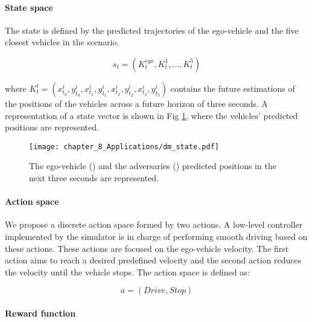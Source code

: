 \paragraph{State space}
\label{par:8_decision_making_our_approach_dm_state_space}

The state is defined by the predicted trajectories of the ego-vehicle and the five closest vehicles in the scenario.

\begin{equation}
	s_t = (K^{ego}_t, K^1_t, ..., K^{5}_t)
	\label{eq:state}
\end{equation}

where $K^{i}_t = (x^i_{t_0}, y^i_{t_0}, x^i_{t_1}, y^i_{t_1}, x^i_{t_2}, y^i_{t_2}, x^i_{t_3}, y^i_{t_3})$ contains the future estimations of the positions of the vehicles across a future horizon of three seconds. A representation of a state vector is shown in Fig \ref{fig:chapter_8_Applications/dm_state}, where the vehicles' predicted positions are represented.

\begin{figure}[h]
	\centering
	\texttt{[image: chapter\_8\_Applications/dm\_state.pdf]}
	\caption{The ego-vehicle (\color{brickred}{red}) and the adversaries (\color{cadetblue}{blue}) predicted positions in the next three seconds are represented.}	
	\label{fig:chapter_8_Applications/dm_state}
\end{figure}

\paragraph{Action space}
\label{par:8_decision_making_our_approach_dm_action_space}

We propose a discrete action space formed by two actions. A low-level controller implemented by the simulator is in charge of performing smooth driving based on these actions. These actions are focused on the ego-vehicle velocity. The first action aims to reach a desired predefined velocity and the second action reduces the velocity until the vehicle stops. The action space is defined as:

\begin{equation}
	a=(Drive, Stop)    
	\label{eq:action}
\end{equation}

\paragraph{Reward function}
\label{par:8_decision_making_our_approach_dm_reward_function}

